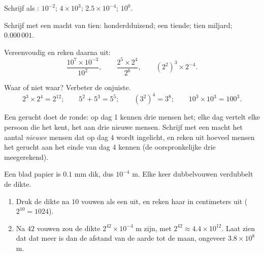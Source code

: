 \begin{exercise}[$\star$]\label{exo:g8:powers:4}
Schrijf als : $10^{-2}$; \quad $4 \times 10^3$; \quad
$2.5 \times 10^{-4}$; \quad $10^0$.
\end{exercise}

\begin{exercise}[$\star$]\label{exo:g8:powers:5}
Schrijf met een macht van tien: honderdduizend; een tiende; tien miljard;
$0.000\,001$.
\end{exercise}

\begin{exercise}[$\star$]\label{exo:g8:powers:6}
Vereenvoudig en reken daarna uit:
\[
\frac{10^7 \times 10^{-3}}{10^2},
\qquad
\frac{2^5 \times 2^4}{2^6},
\qquad
\left(2^2\right)^3 \times 2^{-4} .
\]
\end{exercise}

\begin{exercise}[$\star$]\label{exo:g8:powers:7}
Waar of niet waar? Verbeter de onjuiste.
\[
2^3 \times 2^4 = 2^{12}; \qquad
5^2 + 5^3 = 5^5; \qquad
(3^2)^4 = 3^8; \qquad
10^3 \times 10^3 = 100^3 .
\]
\end{exercise}

\begin{exercise}[$\star\star$]\label{exo:g8:powers:8}
Een gerucht doet de ronde: op dag 1 kennen drie mensen het; elke dag vertelt elke
persoon die het kent, het aan drie nieuwe mensen. Schrijf met een macht het aantal
\emph{nieuwe} mensen dat op dag $4$ wordt ingelicht, en reken uit hoeveel mensen het
gerucht aan het einde van dag 4 kennen (de oorspronkelijke drie meegerekend).
\end{exercise}

\begin{exercise}[$\star\star$]\label{exo:g8:powers:9}
Een blad papier is $0.1$ mm dik, dus $10^{-4}$ m. Elke keer dubbelvouwen verdubbelt de
dikte.
\begin{enumerate}
  \item Druk de dikte na $10$ vouwen als een  uit, en reken haar in centimeters
        uit ($2^{10} = 1024$).
  \item Na $42$ vouwen zou de dikte $2^{42} \times 10^{-4}$ m zijn, met
        $2^{42} \approx 4.4 \times 10^{12}$. Laat zien dat dat meer is dan de afstand
        van de aarde tot de maan, ongeveer $3.8 \times 10^8$ m.
\end{enumerate}
\end{exercise}

